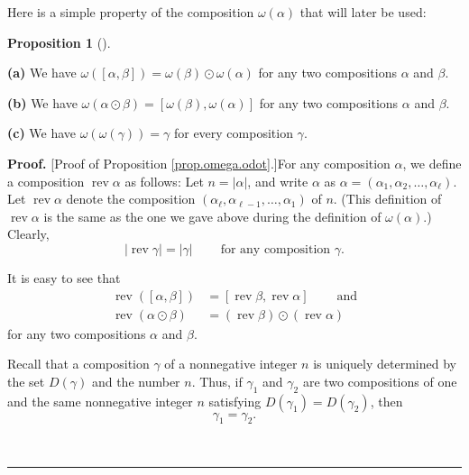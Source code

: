 \documentclass
[numbers=enddot,12pt,final,onecolumn,notitlepage,abstracton]{scrartcl}%
\theoremstyle{definition}
\newtheorem{prop}[theo]{Proposition}
\newenvironment{proposition}[1][]
{\begin{prop}[#1]\begin{leftbar}}
{\end{leftbar}\end{prop}}
\newenvironment{proof}[1][Proof]{\noindent\textbf{#1.} }{\ \rule{0.5em}{0.5em}}
\newenvironment{verlong}{}{}
\begin{document}
\begin{verlong}
Here is a simple property of the composition $\omega\left(  \alpha\right)  $
that will later be used:

\begin{proposition}
\label{prop.omega.odot}\textbf{(a)} We have $\omega\left(  \left[
\alpha,\beta\right]  \right)  =\omega\left(  \beta\right)  \odot\omega\left(
\alpha\right)  $ for any two compositions $\alpha$ and $\beta$.

\textbf{(b)} We have $\omega\left(  \alpha\odot\beta\right)  =\left[
\omega\left(  \beta\right)  ,\omega\left(  \alpha\right)  \right]  $ for any
two compositions $\alpha$ and $\beta$.

\textbf{(c)} We have $\omega\left(  \omega\left(  \gamma\right)  \right)
=\gamma$ for every composition $\gamma$.
\end{proposition}

\begin{proof}
[Proof of Proposition \ref{prop.omega.odot}.]For any composition $\alpha$, we
define a composition $\operatorname*{rev}\alpha$ as follows: Let $n=\left\vert
\alpha\right\vert $, and write $\alpha$ as $\alpha=\left(  \alpha_{1}%
,\alpha_{2},\ldots,\alpha_{\ell}\right)  $. Let $\operatorname*{rev}\alpha$
denote the composition $\left(  \alpha_{\ell},\alpha_{\ell-1},\ldots
,\alpha_{1}\right)  $ of $n$. (This definition of $\operatorname*{rev}\alpha$
is the same as the one we gave above during the definition of $\omega\left(
\alpha\right)  $.) Clearly,%
\begin{equation}
\left\vert \operatorname*{rev}\gamma\right\vert =\left\vert \gamma\right\vert
\ \ \ \ \ \ \ \ \ \ \text{for any composition }\gamma.
\label{pf.prop.omega.odot.rev0}%
\end{equation}


It is easy to see that%
\begin{align}
\operatorname*{rev}\left(  \left[  \alpha,\beta\right]  \right)   &  =\left[
\operatorname*{rev}\beta,\operatorname*{rev}\alpha\right]
\ \ \ \ \ \ \ \ \ \ \text{and}\label{pf.prop.omega.odot.rev1}\\
\operatorname*{rev}\left(  \alpha\odot\beta\right)   &  =\left(
\operatorname*{rev}\beta\right)  \odot\left(  \operatorname*{rev}%
\alpha\right)  \label{pf.prop.omega.odot.rev2}%
\end{align}
for any two compositions $\alpha$ and $\beta$.

Recall that a composition $\gamma$ of a nonnegative integer $n$ is uniquely
determined by the set $D\left(  \gamma\right)  $ and the number $n$. Thus, if
$\gamma_{1}$ and $\gamma_{2}$ are two compositions of one and the same
nonnegative integer $n$ satisfying $D\left(  \gamma_{1}\right)  =D\left(
\gamma_{2}\right)  $, then%
\begin{equation}
\gamma_{1}=\gamma_{2}. \label{pf.prop.omega.odot.gamma1=2}%
\end{equation}



\end{proof}
\end{verlong}
\end{document}
